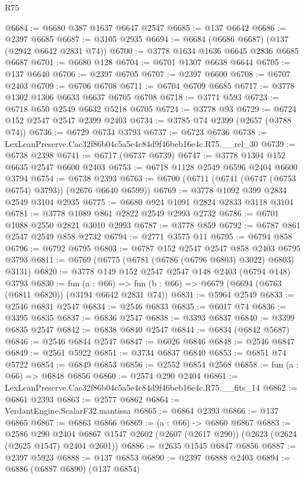 \begin{lexlean}{R75}
\begin{coremodule}
@6684 := @6680 @387 @1637 @6647 @2547
@6685 := @137 @6642
@6686 := @2397 @6685
@6687 := @3105 @2935
@6694 := @6684 (@6686 @6687) (@137 (@2942 @6642 @2831 @74))
@6700 := @3778 @1634 @1636 @6645 @2836 @6685 @6687
@6701 := @6680 @128
@6704 := @6701 @1307 @6638 @6644
@6705 := @137 @6640
@6706 := @2397 @6705
@6707 := @2397 @6600
@6708 := @6707 @2403
@6709 := @6706 @6708
@6711 := @6704 @6709 @6685
@6717 := @3778 @1302 @1306 @6633 @6637 @6705 @6708
@6718 := @3771 @593
@6723 := @6718 @650 @2549 @6632 @5218 @6705
@6724 := @3778 @93
@6729 := @6724 @152 @2547 @2547 @2399 @2403
@6734 := @3785 @74 @2399 (@2657 (@3788 @74))
@6736 := @6729 @6734 @3793
@6737 := @6723 @6736
@6738 := LexLeanPreserve.Cac32f86b04c5a5e4c84d9f46beb16e4c.R75.__rel_30
@6739 := @6738 @2398
@6741 := @6717 (@6737 @6739)
@6747 := @3778 @1304 @152 @6635 @2547 @6600 @2403
@6753 := @6718 @1128 @2549 @6596 @2404 @6600 @3794
@6754 := @6738 @2393
@6763 := @6700 (@6711 (@6741 (@6747 (@6753 @6754) @3793)) (@2676 @6640 @6599))
@6769 := @3778 @1092 @399 @2834 @2549 @3104 @2935
@6775 := @6680 @924 @1091 @2824 @2833 @3118 @3104
@6781 := @3778 @1089 @861 @2822 @2549 @2993 @2732
@6786 := @6701 @1088 @2550 @2821 @3010 @2993
@6787 := @3778 @859
@6792 := @6787 @861 @2547 @2549 @858 @2732
@6794 := @2771 @3575 @11
@6795 := @6794 @858
@6796 := @6792 @6795
@6803 := @6787 @152 @2547 @2547 @858 @2403 @6795 @3793
@6811 := @6769 (@6775 (@6781 (@6786 (@6796 @6803) @3022) @6803) @3131)
@6820 := @3778 @149 @152 @2547 @2547 @148 @2403 (@6794 @148) @3793
@6830 := fun (a : @66) =>
  fun (b : @66) => @6679 (@6694 (@6763 (@6811 @6820)) (@3194 @6642 @2831 @74))
@6831 := @5964 @2549
@6833 := @2546 @6831 @2547
@6834 := @2546 @6833
@6835 := @6017 @74
@6836 := @3395 @6835
@6837 := @6836 @2547
@6838 := @3393 @6837
@6840 := @3399 @6835 @2547
@6842 := @6838 @6840 @2547
@6844 := @6834 (@6842 @5687)
@6846 := @2546 @6844 @2547
@6847 := @6026 @6846
@6848 := @2546 @6847
@6849 := @2561 @5922
@6851 := @3734 @6837 @6840
@6853 := @6851 @74 @5722
@6854 := @6849 @6853
@6856 := @2552 @6854 @2568
@6858 := fun (a : @66) => @6848 @6856
@6860 := @2574 @290 @2404
@6861 := LexLeanPreserve.Cac32f86b04c5a5e4c84d9f46beb16e4c.R75.__fits_14
@6862 := @6861 @2393
@6863 := @2577 @6862
@6864 := VerdantEngine.ScalarF32.mantissa
@6865 := @6864 @2393
@6866 := @137 @6865
@6867 := @6863 @6866
@6869 := (a : @66) -> @6860 @6867
@6883 := @2586
    @290
    @2404
    @6867
    @1547
    @2602
    (@2607 (@2617 @290))
    (@2623 (@2624 (@2625 @1547) @2404 @2601))
@6886 := @2635 @1545 @6847 @6856
@6887 := @2397 @5923
@6888 := @137 @6853
@6890 := @2397 @6888 @2403
@6894 := @6886 (@6887 @6890) (@137 @6854)

\end{coremodule}
\end{lexlean}
